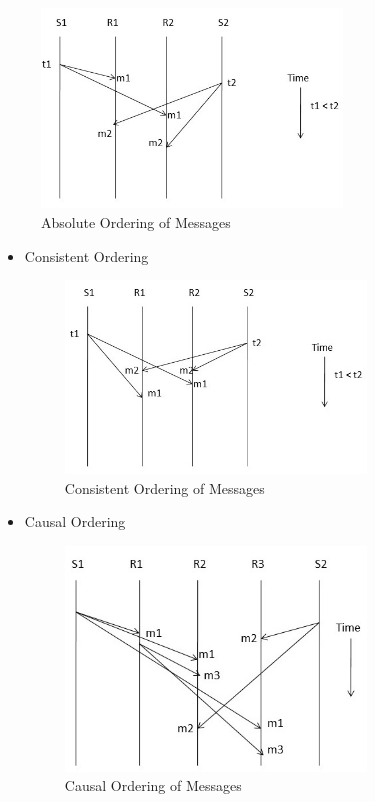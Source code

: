 \documentclass{beamer}
\begin{document}
\begin{frame}[allowframebreaks]
\begin{itemize}
		\framebreak
		\begin{figure}
			\centering
			\includegraphics[width=8cm]{fig315.jpg}
			\caption{Absolute Ordering of Messages}\label{fig315}
		\end{figure}
	\end{itemize}
	\framebreak
	\begin{itemize}
		\item Consistent Ordering
		\begin{figure}
			\centering
			\includegraphics[width=8cm]{fig316.jpg}
			\caption{Consistent Ordering of Messages}\label{fig316}
		\end{figure}
	\end{itemize}
	\framebreak
	\begin{itemize}
		\item Causal Ordering
		\begin{figure}
			\centering
			\includegraphics[width=8cm]{fig317.jpg}
			\caption{Causal Ordering of Messages}\label{fig317}
		\end{figure}
	\end{itemize}
		
\end{frame}
\end{document}
